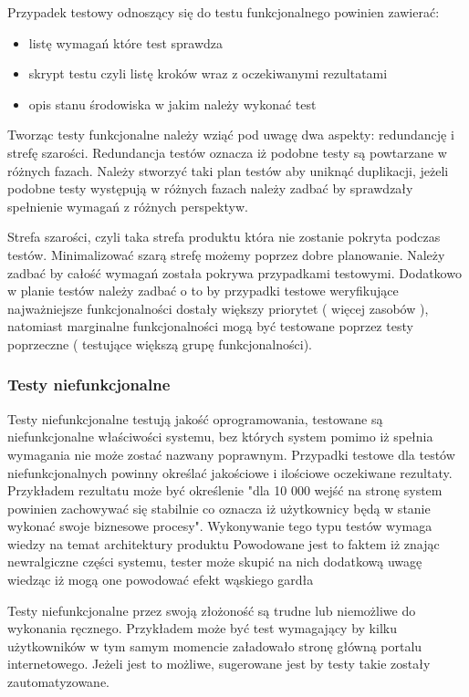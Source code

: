 Przypadek testowy odnoszący się do testu funkcjonalnego powinien zawierać:
\begin{itemize}
  \item  listę wymagań które test sprawdza
  \item skrypt testu czyli listę kroków wraz z oczekiwanymi rezultatami
  \item opis stanu środowiska w jakim należy wykonać test
\end{itemize}

Tworząc testy funkcjonalne należy wziąć pod uwagę dwa aspekty: redundancję i strefę szarości. Redundancja testów oznacza iż podobne testy są powtarzane w różnych fazach. Należy stworzyć taki plan testów aby uniknąć duplikacji, jeżeli podobne testy występują w różnych fazach należy zadbać by sprawdzały spełnienie wymagań z różnych perspektyw. 

Strefa szarości, czyli taka strefa produktu która nie zostanie pokryta podczas testów. Minimalizować szarą strefę możemy poprzez dobre planowanie. Należy zadbać by całość wymagań została pokrywa przypadkami testowymi. Dodatkowo w planie testów należy zadbać o to by przypadki testowe weryfikujące najważniejsze funkcjonalności dostały większy priorytet ( więcej zasobów ), natomiast marginalne funkcjonalności mogą być testowane poprzez testy poprzeczne ( testujące większą grupę funkcjonalności).
\subsubsection{Testy niefunkcjonalne}
Testy niefunkcjonalne testują jakość oprogramowania, testowane są  niefunkcjonalne właściwości systemu, bez których system pomimo iż spełnia wymagania nie może zostać nazwany poprawnym. Przypadki testowe dla testów niefunkcjonalnych powinny określać jakościowe i ilościowe oczekiwane rezultaty. Przykładem rezultatu może być określenie "dla 10 000 wejść na stronę system powinien zachowywać się stabilnie co oznacza iż użytkownicy będą w stanie wykonać swoje biznesowe procesy". Wykonywanie tego typu testów wymaga wiedzy na temat architektury produktu Powodowane jest to faktem iż znając newralgiczne części systemu, tester może skupić na nich dodatkową uwagę wiedząc iż mogą one powodować efekt wąskiego gardła


Testy niefunkcjonalne przez swoją złożoność są trudne lub niemożliwe do wykonania ręcznego. Przykładem może być test wymagający by kilku użytkowników w tym samym momencie załadowało stronę główną portalu internetowego. Jeżeli jest to możliwe, sugerowane jest by testy takie zostały zautomatyzowane.
